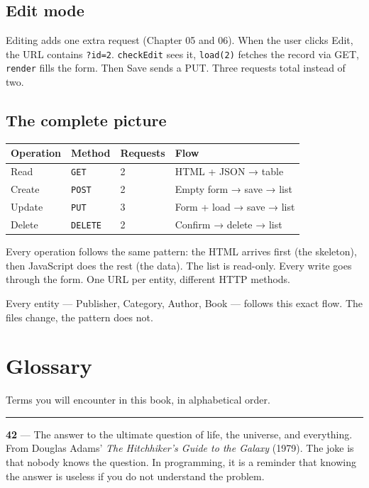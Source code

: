 \documentclass[11pt,a4paper,oneside]{book}
\begin{document}
\hypertarget{edit-mode}{%
\section{Edit mode}\label{edit-mode}}

Editing adds one extra request (Chapter 05 and 06). When the user
clicks Edit, the URL contains \texttt{?id=2}. \texttt{checkEdit}
sees it, \texttt{load(2)} fetches the record via GET,
\texttt{render} fills the form. Then Save sends a PUT. Three
requests total instead of two.

\hypertarget{the-complete-picture}{%
\section{The complete picture}\label{the-complete-picture}}

\begin{longtable}[]{@{}llll@{}}
\toprule
Operation & Method & Requests & Flow \\
\midrule
\endhead
Read & \texttt{GET} & 2 & HTML + JSON → table \\
Create & \texttt{POST} & 2 & Empty form → save → list \\
Update & \texttt{PUT} & 3 & Form + load → save → list \\
Delete & \texttt{DELETE} & 2 & Confirm → delete → list \\
\bottomrule
\end{longtable}

Every operation follows the same pattern: the HTML arrives first
(the skeleton), then JavaScript does the rest (the data). The
list is read-only. Every write goes through the form. One URL per
entity, different HTTP methods.

Every entity --- Publisher, Category, Author, Book --- follows
this exact flow. The files change, the pattern does not.

\newpage

\hypertarget{glossary}{%
\chapter{Glossary}\label{glossary}}

Terms you will encounter in this book, in alphabetical order.

\begin{center}\rule{0.5\linewidth}{0.5pt}\end{center}

\textbf{42} --- The answer to the ultimate question of life, the
universe, and everything. From Douglas Adams' \emph{The
Hitchhiker's Guide to the Galaxy} (1979). The joke is that nobody
knows the question. In programming, it is a reminder that knowing
the answer is useless if you do not understand the problem.
\end{document}
